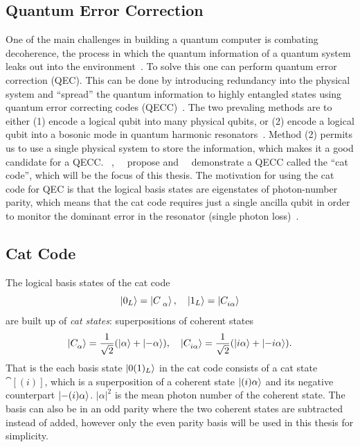 \documentclass[main.tex]{subfiles}
\begin{document}
\subsection{Quantum Error Correction}
One of the main challenges in building a quantum computer is combating decoherence, the process in which the quantum information of a quantum system leaks out into the environment~\cite{gottesman_introduction_2009}.
To solve this one can perform quantum error correction (QEC).
This can be done by introducing redundancy into the physical system and ``spread'' the quantum information to highly entangled states using quantum error correcting codes (QECC)~\cite{gottesman_introduction_2009}.
The two prevaling methods are to either (1) encode a logical qubit into many physical qubits, or (2) encode a logical qubit into a bosonic mode in quantum harmonic resonators~\cite{}.
Method (2) permits us to use a single physical system to store the information, which makes it a good candidate for a QECC.
\citeauthor{leghtas_hardware-efficient_2013}~\cite{leghtas_hardware-efficient_2013},~\citeauthor{mirrahimi_dynamically_2014}~\cite{mirrahimi_dynamically_2014} propose and~\citeauthor{ofek_extending_2016}~\cite{ofek_extending_2016} demonstrate a QECC called the ``cat code'', which will be the focus of this thesis.
The motivation for using the cat code for QEC is that the logical basis states are eigenstates of photon-number parity, which means that the cat code requires just a single ancilla qubit in order to monitor the dominant
error in the resonator (single photon loss)~\cite{ofek_extending_2016}.

\subsection{Cat Code}%
\label{sec:cat-code}
The logical basis states of the cat code
\begin{equation}
    \ket{0_L} = \cat{},\quad \ket{1_L} = \cat[i]{}
\end{equation}
are built up of \emph{cat states}: superpositions of coherent states
\begin{equation}
	\cat[]{} = \frac{1}{\sqrt{2}}\qty(\ket{\alpha} + \ket{-\alpha}),\quad 
	\cat[i]{} = \frac{1}{\sqrt{2}}\qty(\ket{i\alpha} + \ket{-i\alpha}).
\end{equation}
That is the each basis state \( \ket{0(1)_L} \) in the cat code consists of a cat state \(\cat[(i)]{}\), which is a superposition of a coherent state \(\ket{(i)\alpha}\) and its negative counterpart \(\ket{-(i)\alpha}\). \(|\alpha|^2\) is the mean photon number of the coherent state.
The basis can also be in an odd parity where the two coherent states are subtracted instead of added, however only the even parity basis will be used in this thesis for simplicity.
\end{document}
